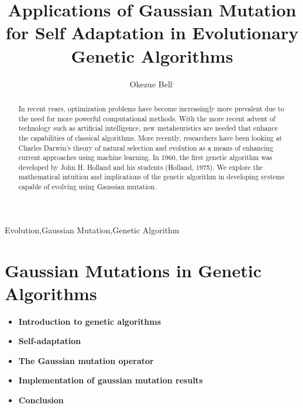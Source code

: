 \documentclass{JMLFS}
\begin{document}
\title{Applications of Gaussian Mutation for Self Adaptation in Evolutionary Genetic Algorithms}

\author{Okezue Bell$^,$}
\address{$^1$Harvard Medical School-MIT, aobell@mgh.harvard.edu}
\address{$^2$Moravian Academy Upper School}

\begin{abstract}
In recent years, optimization problems have become increasingly more prevalent due to the need for more powerful computational methods. With the more recent advent of technology such as artificial intelligence, new metaheuristics are needed that enhance the capabilities of classical algorithms. More recently, researchers have been looking at Charles Darwin's theory of natural selection and evolution as a means of enhancing current approaches using machine learning. In 1960, the first genetic algorithm was developed by John H. Holland and his students (Holland, 1975). We explore the mathematical intuition and implications of the genetic algorithm in developing systems capable of evolving using Gaussian mutation.
\end{abstract}


\maketitle

\begin{keyword}
Evolution\sep Gaussian Mutation\sep Genetic Algorithm
\end{keyword}


\section{Gaussian Mutations in Genetic Algorithms}


\begin{itemize}
\item {\bf Introduction to genetic algorithms}
\item {\bf Self-adaptation}
\item {\bf The Gaussian mutation operator}
\item {\bf Implementation of gaussian mutation results}
\item {\bf Conclusion}
\end{itemize}
\end{document}
